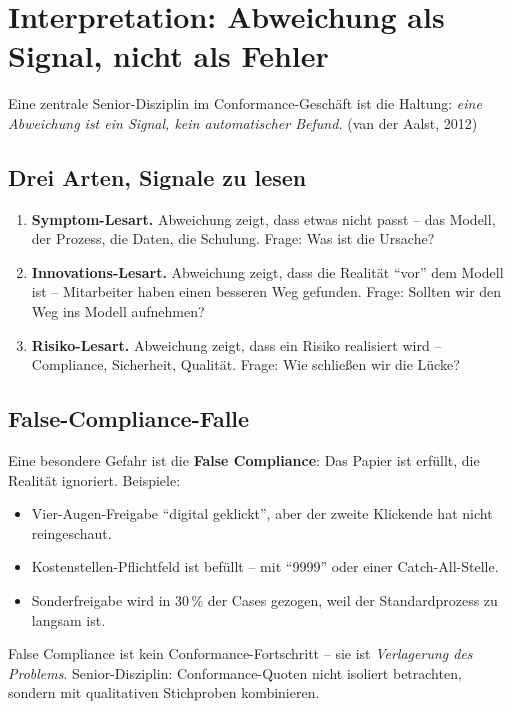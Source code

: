 \documentclass[11pt,a4paper,oneside]{article}
\newcommand{\fachbegriff}[1]{\textbf{#1}}
\newcommand{\quelle}[1]{{\footnotesize\color{lpGray}(#1)}}
\begin{document}
\section{Interpretation: Abweichung als Signal, nicht als Fehler}

Eine zentrale Senior-Disziplin im Conformance-Geschäft ist die Haltung: \emph{eine Abweichung ist ein Signal, kein automatischer Befund.} \quelle{van der Aalst, 2012}

\subsection{Drei Arten, Signale zu lesen}

\begin{enumerate}
  \item \fachbegriff{Symptom-Lesart.} Abweichung zeigt, dass etwas nicht passt -- das Modell, der Prozess, die Daten, die Schulung. Frage: Was ist die Ursache?
  \item \fachbegriff{Innovations-Lesart.} Abweichung zeigt, dass die Realität ``vor'' dem Modell ist -- Mitarbeiter haben einen besseren Weg gefunden. Frage: Sollten wir den Weg ins Modell aufnehmen?
  \item \fachbegriff{Risiko-Lesart.} Abweichung zeigt, dass ein Risiko realisiert wird -- Compliance, Sicherheit, Qualität. Frage: Wie schließen wir die Lücke?
\end{enumerate}

\subsection{False-Compliance-Falle}

Eine besondere Gefahr ist die \fachbegriff{False Compliance}: Das Papier ist erfüllt, die Realität ignoriert. Beispiele:

\begin{itemize}
  \item Vier-Augen-Freigabe ``digital geklickt'', aber der zweite Klickende hat nicht reingeschaut.
  \item Kostenstellen-Pflichtfeld ist befüllt -- mit ``9999'' oder einer Catch-All-Stelle.
  \item Sonderfreigabe wird in 30\,\% der Cases gezogen, weil der Standardprozess zu langsam ist.
\end{itemize}

False Compliance ist kein Conformance-Fortschritt -- sie ist \emph{Verlagerung des Problems}. Senior-Disziplin: Conformance-Quoten nicht isoliert betrachten, sondern mit qualitativen Stichproben kombinieren.
\end{document}
